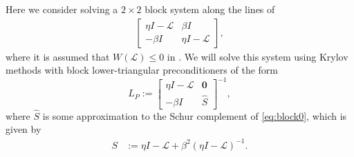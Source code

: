 \documentclass[a4paper,10pt]{article}
\begin{document}
Here we consider solving a $2\times 2$ block system along the lines of
%
\begin{align}\label{eq:block0}
\begin{bmatrix} \eta I - \mathcal{L} & \beta I\\
-\beta I & \eta I - \mathcal{L} \end{bmatrix},
\end{align}
%
where it is assumed that $W(\mathcal{L}) \leq 0$ in . We will solve
this system using Krylov methods with block lower-triangular preconditioners of the form
%
\begin{equation}\label{eq:Lprec}
L_P := \begin{bmatrix} \eta I - \mathcal{L} & \mathbf{0} \\ -\beta I
	& \widehat{S} \end{bmatrix}^{-1},
\end{equation}
%
where $\widehat{S}$ is some approximation to the Schur complement of \eqref{eq:block0},
which is given by
%
\begin{align}\label{eq:Schur}
S & := \eta I - \mathcal{L} + \beta^2 (\eta I - \mathcal{L})^{-1}.
\end{align}
%
\end{document}
